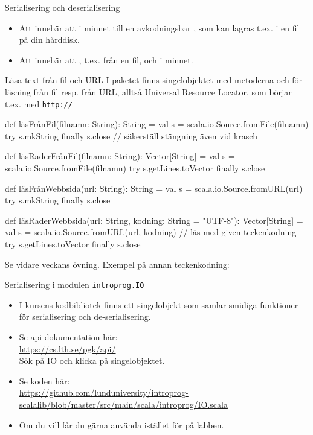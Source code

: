 


\begin{Slide}{Serialisering och deserialisering}
\begin{itemize}
  \item Att  innebär att  i minnet till en avkodningsbar , som kan lagras t.ex. i en fil på din hårddisk.
  \item Att  innebär att , t.ex. från en fil, och  i minnet.
\end{itemize}
\end{Slide}


\begin{Slide}{Läsa text från fil och URL}\SlideFontSmall
I paketet  finns singelobjektet  med metoderna  och  för läsning från fil resp. från  URL, alltså Universal Resource Locator, som börjar t.ex. med \texttt{http://}
\begin{Code}
def läsFrånFil(filnamn: String): String = 
  val s = scala.io.Source.fromFile(filnamn)
  try s.mkString finally s.close // säkerställ stängning även vid krasch

def läsRaderFrånFil(filnamn: String): Vector[String] =
  val s = scala.io.Source.fromFile(filnamn)
  try s.getLines.toVector finally s.close 

def läsFrånWebbsida(url: String): String = 
  val s = scala.io.Source.fromURL(url)
  try s.mkString finally s.close

def läsRaderWebbsida(url: String, kodning: String = "UTF-8"): Vector[String] =
  val s = scala.io.Source.fromURL(url, kodning) // läs med given teckenkodning
  try s.getLines.toVector finally s.close 

\end{Code}
{\SlideFontTiny Se vidare veckans övning. Exempel på annan teckenkodning:  }
\end{Slide}


\begin{Slide}{Serialisering i modulen \texttt{introprog.IO}}
\begin{itemize}
\item I kursens kodbibliotek  finns ett singelobjekt  som samlar smidiga funktioner för serialisering och de-serialisering. 
\item Se api-dokumentation här: \\ \url{https://cs.lth.se/pgk/api/} \\ Sök på IO och klicka på singelobjektet.
\item Se koden här:\\
\url{https://github.com/lunduniversity/introprog-scalalib/blob/master/src/main/scala/introprog/IO.scala}
\item Om du vill får du gärna använda  istället för  på labben.  
\end{itemize}
\end{Slide}
